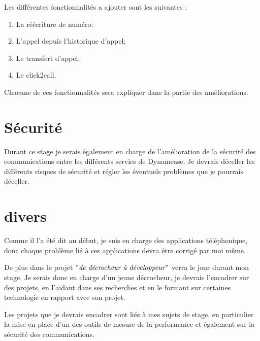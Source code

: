 Les différentes fonctionnalités a ajouter sont les suivantes :

\begin{enumerate}
	\item La réécriture de numéro;
	\item L'appel depuis l'historique d'appel;
	\item Le transfert d'appel;
	\item Le click2call.
\end{enumerate}

Chacune de ces fonctionnalités sera expliquer dans la partie des améliorations.

\section{Sécurité}

Durant ce stage je serais également en charge de l'amélioration de la sécurité des communications entre les différents servics de Dynamease. Je devrais déceller les différents risques de sécurité et régler les éventuels problèmes que je pourrais déceller.

\section{divers}

Comme il l'a été dit au début, je suis en charge des applications téléphonique, donc chaque problème lié à ces applications devra être corrigé par moi même.

De plus dans le projet $"\textit{de décrocheur à développeur}"$ verra le jour durant mon stage. Je serais donc en charge d'un jeune décrocheur, je devrais l'encadrer sur des projets, en l'aidant dans ses recherches et en le formant sur certaines technologie en rapport avec son projet.

Les projets que je devrais encadrer sont liés à mes sujets de stage, en particulier la mise en place d'un des outils de mesure de la performance et également sur la sécurité des communications.